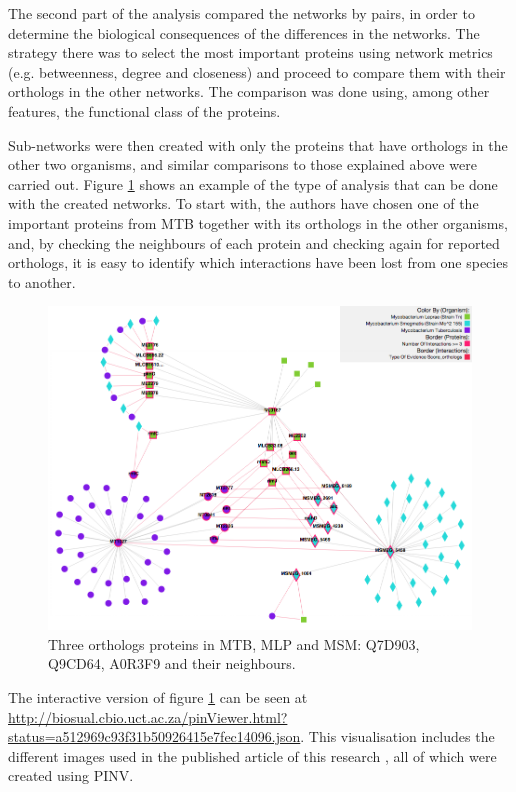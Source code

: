 The second part of the analysis compared the networks by pairs, in order to determine the biological consequences of the differences in the networks. The strategy there was to select the most important proteins using network metrics (e.g. betweenness, degree and closeness) and proceed to compare them with their orthologs in the other networks. The comparison was done using, among other features, the functional class of the proteins. 

Sub-networks were then created with only the proteins that have orthologs in the other two organisms, and similar comparisons to those explained above were carried out. Figure \ref{fig:pinv_orthologs} shows an example of the type of analysis that can be done with the created networks. To start with, the authors have chosen one of the important proteins from MTB together with its orthologs in the other organisms, and, by checking the neighbours of each protein and checking again for reported orthologs, it is easy to identify which interactions have been lost from one species to another.

\begin{figure}
\centering
\includegraphics[width=\textwidth]{figures/pinv_orthologs.png}
\caption[Three ortholog proteins in MTB, MLP and MSM]{Three orthologs proteins in MTB, MLP and MSM: Q7D903, Q9CD64, A0R3F9 and their neighbours.
\label{fig:pinv_orthologs}}
\end{figure}

The interactive version of figure \ref{fig:pinv_orthologs} can be seen at \url{http://biosual.cbio.uct.ac.za/pinViewer.html?status=a512969c93f31b50926415e7fec14096.json}. This visualisation includes the different images used in the published article of this research \cite{AKI2013}, all of which were created using PINV.


